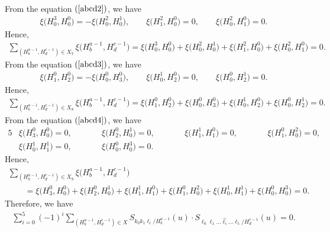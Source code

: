 \documentclass[10pt,a4paper]{amsart}
\numberwithin{equation}{section}
\begin{document}
\begin{Example}
\begin{gather*}
\end{gather*}
From the equation $(\ref{abcd2})$, we have
\begin{gather*}
\xi\bigl(H^{3}_{0},H^{0}_{0}\bigr)=-\xi\bigl(H^{2}_{0},H^{1}_{0}\bigr),\qquad \xi\bigl(H^{2}_{1},H^{0}_{0}\bigr)=0,\qquad \xi\bigl(H^{2}_{0},H^{0}_{1}\bigr)=0.
\end{gather*}
Hence,
\begin{gather*}
\sum_{(H^{a-1}_{b},H^{c-1}_{d})\in X_7}\xi\bigl(H^{a-1}_{b},H^{c-1}_{d}\bigr)=\xi\bigl(H^{3}_{0},H^{0}_{0}\bigr)+\xi\bigl(H^{2}_{0},H^{1}_{0}\bigr)+\xi\bigl(H^{2}_{1},H^{0}_{0}\bigr)+\xi\bigl(H^{2}_{0},H^{0}_{1}\bigr)=0.
\end{gather*}
From the equation $(\ref{abcd3})$, we have
\begin{gather*}
\xi\bigl(H^{0}_{1},H^{0}_{2}\bigr)=-\xi\bigl(H^{0}_{0},H^{0}_{3}\bigr),\qquad \xi\bigl(H^{1}_{0},H^{0}_{2}\bigr)=0,\qquad \xi\bigl(H^{0}_{0},H^{1}_{2}\bigr)=0.
\end{gather*}
Hence,
\begin{gather*}
\sum_{(H^{a-1}_{b},H^{c-1}_{d})\in X_8}\xi\bigl(H^{a-1}_{b},H^{c-1}_{d}\bigr)=\xi\bigl(H^{0}_{1},H^{0}_{2}\bigr)+\xi\bigl(H^{0}_{0}, H^{0}_{3}\bigr)+\xi\bigl(H^{1}_{0},H^{0}_{2}\bigr)+\xi\bigl(H^{0}_{0},H^{1}_{2}\bigr)=0.
\end{gather*}
From the equation $(\ref{abcd4})$, we have
\begin{alignat*}{5}
&\xi\bigl(H^{0}_{3},H^{0}_{0}\bigr)=0,\qquad&& \xi\bigl(H^{0}_{2},H^{1}_{0}\bigr)=0,\qquad&& \xi\bigl(H^{1}_{1},H^{0}_{1}\bigr)=0,\qquad&& \xi\bigl(H^{0}_{1},H^{2}_{0}\bigr)=0,& \\
&\xi\bigl(H^{1}_{0},H^{1}_{1}\bigr)=0,\qquad&& \xi\bigl(H^{0}_{0},H^{3}_{0}\bigr)=0.&
\end{alignat*}
Hence,
\begin{gather*}
\sum_{(H^{a-1}_{b},H^{c-1}_{d})\in X_9}\xi\bigl(H^{a-1}_{b},H^{c-1}_{d}\bigr)\\
\qquad{}=\xi\bigl(H^{0}_{3},H^{0}_{0}\bigr)+\xi\bigl(H^{0}_{2},H^{1}_{0}\bigr)+\xi\bigl(H^{1}_{1},H^{0}_{1}\bigr)+\xi\bigl(H^{0}_{1},H^{2}_{0}\bigr)+\xi\bigl(H^{1}_{0},H^{1}_{1}\bigr)+\xi\bigl(H^{0}_{0},H^{3}_{0}\bigr)=0.
\end{gather*}
Therefore, we have
\begin{gather*}
\sum_{i=0}^{5}{(-1)}^{i}\sum_{(H^{a-1}_{b},H^{c-1}_{d})\in X}S_{k_0 k_1 \ell_i/H^{a-1}_{b}}(u)\cdot S_{\ell_0 \ell_1 \dots \widehat{\ell_i} \dots \ell_{5}/H^{c-1}_{d}}(u)=0.
\end{gather*}
\end{Example}
\end{document}
